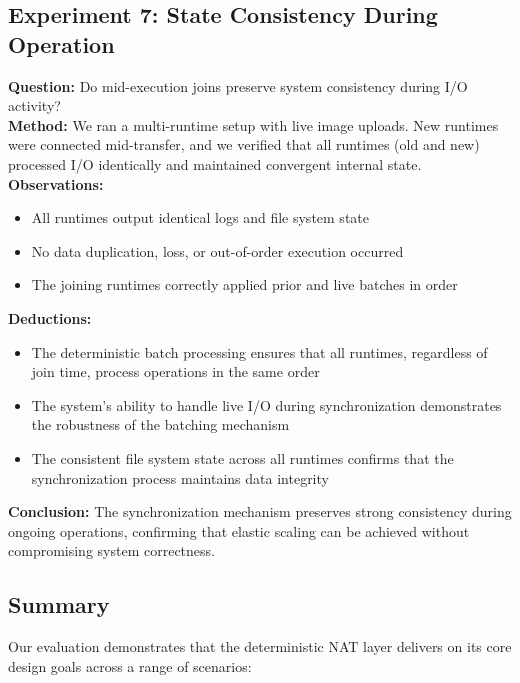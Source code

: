 \documentclass[10pt, 
]{IEEEtran}
\begin{document}
\subsection{Experiment 7: State Consistency During Operation}
\textbf{Question:} Do mid-execution joins preserve system consistency during I/O activity? \\
\textbf{Method:} We ran a multi-runtime setup with live image uploads. New runtimes were connected mid-transfer, and we verified that all runtimes (old and new) processed I/O identically and maintained convergent internal state. \\
\textbf{Observations:}
\begin{itemize}
    \item All runtimes output identical logs and file system state
    \item No data duplication, loss, or out-of-order execution occurred
    \item The joining runtimes correctly applied prior and live batches in order
\end{itemize}
\textbf{Deductions:}
\begin{itemize}
    \item The deterministic batch processing ensures that all runtimes, regardless of join time, process operations in the same order
    \item The system's ability to handle live I/O during synchronization demonstrates the robustness of the batching mechanism
    \item The consistent file system state across all runtimes confirms that the synchronization process maintains data integrity
\end{itemize}
\textbf{Conclusion:} The synchronization mechanism preserves strong consistency during ongoing operations, confirming that elastic scaling can be achieved without compromising system correctness.

\subsection{Summary}
Our evaluation demonstrates that the deterministic NAT layer delivers on its core design goals across a range of scenarios:
\end{document}
